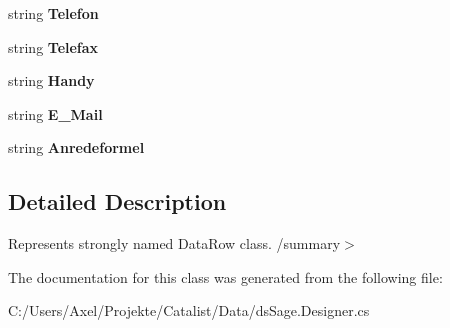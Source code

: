 \begin{DoxyCompactItemize}
\item 
string {\bfseries Telefon}\hypertarget{class_products_1_1_data_1_1ds_sage_1_1_supplier_contact_row_a6dbd25452a7601d5c8cf09a69c3a0ab3}{}\label{class_products_1_1_data_1_1ds_sage_1_1_supplier_contact_row_a6dbd25452a7601d5c8cf09a69c3a0ab3}

\item 
string {\bfseries Telefax}\hypertarget{class_products_1_1_data_1_1ds_sage_1_1_supplier_contact_row_ade648eab3695d871803baebcadc6dd6c}{}\label{class_products_1_1_data_1_1ds_sage_1_1_supplier_contact_row_ade648eab3695d871803baebcadc6dd6c}

\item 
string {\bfseries Handy}\hypertarget{class_products_1_1_data_1_1ds_sage_1_1_supplier_contact_row_a2e2809858e07f6e7008f3340469609e4}{}\label{class_products_1_1_data_1_1ds_sage_1_1_supplier_contact_row_a2e2809858e07f6e7008f3340469609e4}

\item 
string {\bfseries E\+\_\+\+Mail}\hypertarget{class_products_1_1_data_1_1ds_sage_1_1_supplier_contact_row_aa4f4c51a5e839a806f43d6f8107bcb0f}{}\label{class_products_1_1_data_1_1ds_sage_1_1_supplier_contact_row_aa4f4c51a5e839a806f43d6f8107bcb0f}

\item 
string {\bfseries Anredeformel}\hypertarget{class_products_1_1_data_1_1ds_sage_1_1_supplier_contact_row_ac7dc7c1482172468be58b05898b83944}{}\label{class_products_1_1_data_1_1ds_sage_1_1_supplier_contact_row_ac7dc7c1482172468be58b05898b83944}

\end{DoxyCompactItemize}


\subsection{Detailed Description}
Represents strongly named Data\+Row class. /summary$>$ 

The documentation for this class was generated from the following file\+:\begin{DoxyCompactItemize}
\item 
C\+:/\+Users/\+Axel/\+Projekte/\+Catalist/\+Data/ds\+Sage.\+Designer.\+cs\end{DoxyCompactItemize}
